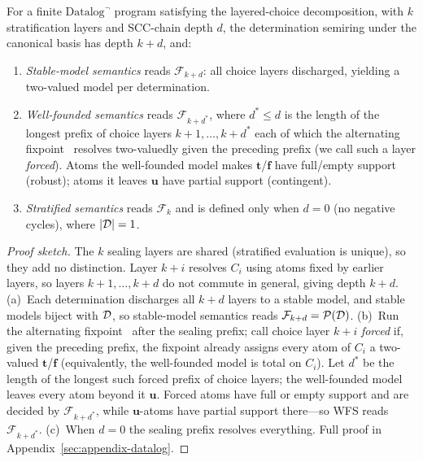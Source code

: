 \begin{theorem}
  \label{thm:negation-general}
  For a finite $\mbox{Datalog}^\neg$ program satisfying the layered-choice
  decomposition, with $k$ stratification layers and SCC-chain depth $d$, the
  determination semiring under the canonical basis has depth $k + d$, and:
  \begin{enumerate}[nosep,label=(\alph*)]
    \item \emph{Stable-model semantics} reads $\mathcal{F}_{k+d}$: all choice
          layers discharged, yielding a two-valued model per determination.
    \item \emph{Well-founded semantics} reads $\mathcal{F}_{k+d^\ast}$, where
          $d^\ast \le d$ is the length of the longest prefix of choice layers
          $k{+}1, \dots, k{+}d^\ast$ each of which the alternating
          fixpoint~\cite{vanGelder1991wellFounded} resolves two-valuedly given
          the preceding prefix (we call such a layer \emph{forced}). Atoms the
          well-founded model makes $\mathbf{t}$/$\mathbf{f}$ have full/empty
          support (robust); atoms it leaves $\mathbf{u}$ have partial support
          (contingent).
    \item \emph{Stratified semantics} reads $\mathcal{F}_k$ and is defined
          only when $d = 0$ (no negative cycles), where $|\mathcal{D}| = 1$.
  \end{enumerate}
\end{theorem}
\begin{proof}[Proof sketch]
  The $k$ sealing layers are shared (stratified evaluation is unique), so they
  add no distinction. Layer $k{+}i$ resolves $C_i$ using atoms fixed by
  earlier layers, so layers $k{+}1,\dots,k{+}d$ do not commute in general,
  giving depth $k+d$. (a)~Each determination discharges all $k+d$ layers to a
  stable model, and stable models biject with $\mathcal{D}$, so stable-model
  semantics reads $\mathcal{F}_{k+d} = \mathcal{P}(\mathcal{D})$. (b)~Run the
  alternating fixpoint~\cite{vanGelder1991wellFounded} after the sealing
  prefix; call choice layer $k{+}i$ \emph{forced} if, given the preceding
  prefix, the fixpoint already assigns every atom of $C_i$ a two-valued
  $\mathbf{t}$/$\mathbf{f}$ (equivalently, the well-founded model is total on
  $C_i$). Let $d^\ast$ be the length of the longest such forced prefix of
  choice layers; the well-founded model leaves every atom beyond it
  $\mathbf{u}$. Forced atoms have full or empty support and are decided by
  $\mathcal{F}_{k+d^\ast}$, while $\mathbf{u}$-atoms have partial support
  there---so WFS reads $\mathcal{F}_{k+d^\ast}$. (c)~When $d = 0$ the sealing
  prefix resolves everything. Full proof in Appendix~\ref{sec:appendix-datalog}.
\end{proof}

